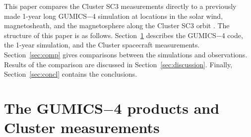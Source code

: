 \documentclass[b5paper,10pt]{article}
\begin{document}
This paper compares the Cluster SC3 measurements directly to a previously made 1-year long GUMICS$-$4 simulation at locations in the solar wind, magnetosheath, and the magnetosphere along the Cluster SC3 orbit \citep{facsko16:_one_earth}. %
The structure of this paper is as follows. Section~\ref{sec:data} describes the GUMICS$-$4 code, the 1-year simulation, and the Cluster spacecraft measurements. Section~\ref{sec:comp} gives comparisons between the simulations and observations. Results of the comparison are discussed in Section~\ref{sec:discussion}. Finally, Section~\ref{sec:concl} contains the conclusions.

\section{The GUMICS$-$4 products and Cluster measurements}
\label{sec:data}


\end{document}
